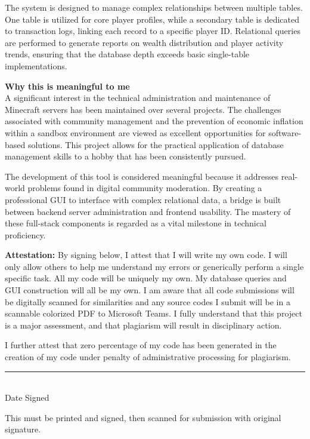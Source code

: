 \documentclass{article}
\begin{document}
The system is designed to manage complex relationships between multiple tables. One table is utilized for core player profiles, while a secondary table is dedicated to transaction logs, linking each record to a specific player ID. Relational queries are performed to generate reports on wealth distribution and player activity trends, ensuring that the database depth exceeds basic single-table implementations.

\vspace{1em}

\textbf{Why this is meaningful to me} \\
A significant interest in the technical administration and maintenance of Minecraft servers has been maintained over several projects. The challenges associated with community management and the prevention of economic inflation within a sandbox environment are viewed as excellent opportunities for software-based solutions. This project allows for the practical application of database management skills to a hobby that has been consistently pursued.

The development of this tool is considered meaningful because it addresses real-world problems found in digital community moderation. By creating a professional GUI to interface with complex relational data, a bridge is built between backend server administration and frontend usability. The mastery of these full-stack components is regarded as a vital milestone in technical proficiency.

\vfill

\textbf{Attestation:} By signing below, I attest that I will write my own code.  I will only allow others to help me understand my errors or generically perform a single specific task.  All my code will be uniquely my own.  My database queries and GUI construction will all be my own.  I am aware that all code submissions will be digitally scanned for similarities and any source codes I submit will be in a scannable colorized PDF to Microsoft Teams. I fully understand that this project is a major assessment, and that plagiarism will result in disciplinary action.

\vspace{1em}

I further attest that zero percentage of my code has been generated in the creation of my code under penalty of administrative processing for plagiarism.
 
\vspace{4em}

\hfill \rule{20em}{0.4pt} \\
\phantom{ } \hfill Date Signed

\vspace{1em}

This must be printed and signed, then scanned for submission with original signature.
\end{document}
